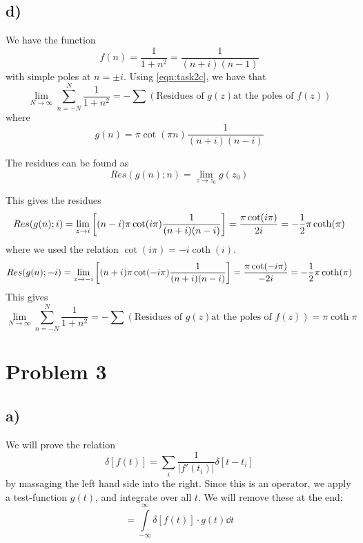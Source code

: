 \documentclass[10pt,a4paper]{article}
\newcommand{\infint}{\int\limits_{-\infty}^{\infty}}
\newcommand{\limN}{\lim_{N\rightarrow \infty}}
\begin{document}
\subsection*{d)}
We have the function
\begin{equation}
    f(n) = \frac{1}{1+n^2} = \frac{1}{(n+i)(n-1)}
\end{equation}
with simple poles at $n = \pm i$. Using \ref{eqn:task2c}, we have that
\begin{equation}
    \limN \sum_{n=-N}^{N} \frac{1}{1+n^2} = - \sum(\text{Residues of } g(z) \text{at the poles of } f(z))
\end{equation}
where
\begin{equation}
    g(n) = \pi\cot(\pi n) \frac{1}{(n+i)(n-i)}
\end{equation}

The residues can be found as
\begin{equation}
    Res(g(n); n) = \lim_{z\rightarrow z_0} g(z_0)
\end{equation}

This gives the residues
\begin{align}
    Res(g(n); i) = \lim_{z\rightarrow i}\qty[(n-i)\pi\cot(i\pi)\frac{1}{(n+i)(n-i)}] = \frac{\pi\cot(i\pi)}{2i} = -\frac{1}{2}\pi\coth(\pi)
\end{align}
where we used the relation $\cot(i\pi) = -i\coth(i)$.
\begin{align}
    Res(g(n); -i) = \lim_{z\rightarrow -i}\qty[(n+i)\pi\cot(-i\pi)\frac{1}{(n+i)(n-i)}] = \frac{\pi\cot(-i\pi)}{-2i} = -\frac{1}{2}\pi\coth(\pi)
\end{align}
This gives
\begin{equation}
    \limN \sum_{n=-N}^{N} \frac{1}{1+n^2} = - \sum(\text{Residues of } g(z) \text{at the poles of } f(z)) = \pi \coth{\pi}
\end{equation}




\section*{Problem 3}
\subsection*{a)}
We will prove the relation
\begin{equation}\label{eqn:task3a}
    \delta[f(t)] = \sum_i \frac{1}{|f'(t_i)|}\delta[t-t_i]
\end{equation}
by massaging the left hand side into the right. Since this is an operator, we apply a test-function $g(t)$, and integrate over all $t$. We will remove these at the end:
\begin{equation}
    = \infint \delta[f(t)]\cdot g(t)\dd{t}
\end{equation}
\end{document}
